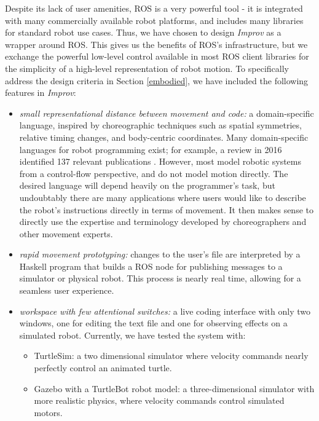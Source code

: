 \documentclass[sigconf]{acmart}
\begin{document}
Despite its lack of user amenities, ROS is a very powerful tool - it is
integrated with many commercially available robot platforms, and includes many
libraries for standard robot use cases. Thus, we have chosen to design
\emph{Improv} as a wrapper around ROS. This gives us the benefits of ROS's
infrastructure, but we exchange the powerful low-level control available in
most ROS client libraries for the simplicity of a high-level representation of
robot motion.
To specifically address the design criteria in Section \ref{embodied}, we have
included the following features in \emph{Improv}:

\begin{itemize}
\item \emph{small representational distance between
movement and code:} a domain-specific language, inspired by choreographic
techniques such as spatial symmetries, relative timing changes, and body-centric
coordinates. Many domain-specific languages for robot programming exist; for example, a
review in 2016 identified 137 relevant publications 
\cite{nordmann2016survey}. However, most model robotic
systems from a control-flow perspective, and do not model motion directly. The
desired language will depend heavily on the programmer's task, but undoubtably
there are many applications where users would like to describe the robot's
instructions directly in terms of movement. It then makes sense to directly use
the expertise and terminology developed by choreographers and other movement
experts. 
\item 
\emph{rapid movement prototyping:} changes to the user's file are interpreted by a 
Haskell program that builds a ROS node for publishing messages to a
simulator or physical robot. This process is nearly real time, allowing for a
seamless user experience.
\item \emph{workspace with few attentional switches:}
a live coding interface with only two windows, one for editing the text file and
one for observing effects on a simulated robot. Currently, we have tested the
system with:
\begin{itemize}
  \item
    TurtleSim: a two dimensional simulator where
    velocity commands nearly perfectly control an animated turtle.
  \item
    Gazebo with a TurtleBot robot model: a three-dimensional simulator
    with more realistic physics, where velocity commands control
    simulated motors.
  \end{itemize}
\end{itemize}
\end{document}
